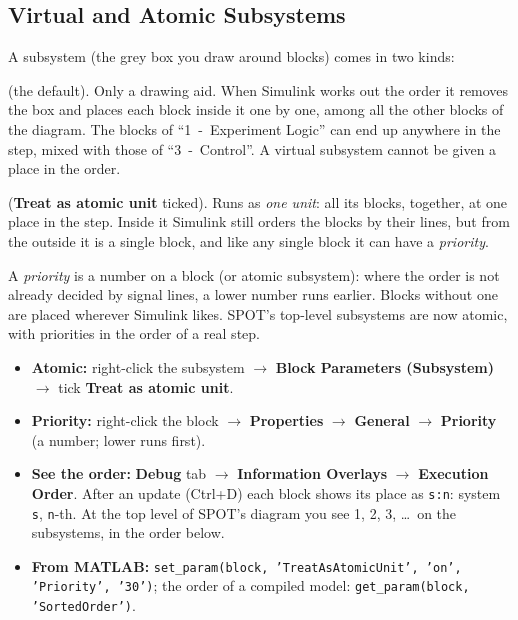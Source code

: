 \documentclass[11pt,a4paper]{article}
\newcommand{\ui}[1]{\textsf{\textbf{#1}}}
\newcommand{\fn}[1]{\texttt{#1}}
\begin{document}
\subsection{Virtual and Atomic Subsystems}
A subsystem (the grey box you draw around blocks) comes in two kinds:
\begin{description}[leftmargin=1.2em]
  \item[Virtual] (the default). Only a drawing aid. When Simulink works out the order it removes the box and
        places each block inside it one by one, among all the other blocks of the diagram. The blocks of
        ``1~-~Experiment Logic'' can end up anywhere in the step, mixed with those of ``3~-~Control''.
        A virtual subsystem cannot be given a place in the order.
  \item[Atomic] (\ui{Treat as atomic unit} ticked). Runs as \emph{one unit}: all its blocks, together, at one
        place in the step. Inside it Simulink still orders the blocks by their lines, but from the outside it is
        a single block, and like any single block it can have a \emph{priority}.
\end{description}
A \emph{priority} is a number on a block (or atomic subsystem): where the order is not already decided by
signal lines, a lower number runs earlier. Blocks without one are placed wherever Simulink likes. SPOT's
top-level subsystems are now atomic, with priorities in the order of a real step.

\begin{tipbox}
\begin{itemize}[leftmargin=1.2em]
  \item \textbf{Atomic:} right-click the subsystem $\rightarrow$ \ui{Block Parameters (Subsystem)} $\rightarrow$
        tick \ui{Treat as atomic unit}.
  \item \textbf{Priority:} right-click the block $\rightarrow$ \ui{Properties} $\rightarrow$ \ui{General}
        $\rightarrow$ \ui{Priority} (a number; lower runs first).
  \item \textbf{See the order:} \ui{Debug} tab $\rightarrow$ \ui{Information Overlays} $\rightarrow$
        \ui{Execution Order}. After an update (Ctrl+D) each block shows its place as \fn{s:n}: system \fn{s},
        \fn{n}-th. At the top level of SPOT's diagram you see 1, 2, 3, \ldots\ on the subsystems, in the order
        below.
  \item \textbf{From MATLAB:} \fn{set\_param(block, 'TreatAsAtomicUnit', 'on', 'Priority', '30')}; the order
        of a compiled model: \fn{get\_param(block, 'SortedOrder')}.
\end{itemize}
\end{tipbox}
\end{document}
